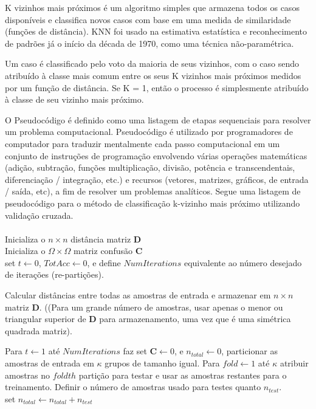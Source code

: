 \documentclass[letterpaper, 10 pt, conference]{ieeeconf}  %
\begin{document}
K vizinhos mais próximos é um algoritmo simples que armazena todos os casos disponíveis e classifica novos casos com base em uma medida de similaridade (funções de distância). KNN foi usado na estimativa estatística e reconhecimento de padrões já o início da década de 1970, como uma técnica não-paramétrica.

Um caso é classificado pelo voto da maioria de seus vizinhos, com o caso sendo atribuído à classe mais comum entre os seus K vizinhos mais próximos medidos por um função de distância. Se K = 1, então o processo é simplesmente atribuído à classe de seu vizinho mais próximo.

O Pseudocódigo é definido como uma listagem de etapas sequenciais para resolver um problema computacional. Pseudocódigo é utilizado por programadores de computador para traduzir mentalmente cada passo computacional em um conjunto de instruções de programação envolvendo várias operações matemáticas (adição, subtração, funções multiplicação, divisão, potência e transcendentais, diferenciação / integração, etc.) e recursos (vetores, matrizes, gráficos, de entrada / saída, etc), a fim de resolver um problemas analíticos. Segue uma listagem de pseudocódigo para o método de classificação k-vizinho mais próximo utilizando validação cruzada. \\
\\
Inicializa o $n \times n$ distância matriz $\textbf{D}$ \\
Inicializa o $\Omega \times \Omega$ matriz confusão $\textbf{C}$ \\

set $t \leftarrow 0$, $TotAcc \leftarrow 0$, e define $NumIterations$ equivalente ao número desejado de  iterações (re-partições). 
 
Calcular distâncias entre todas as amostras de entrada e armazenar em $n \times n$ matriz $\textbf{D} $. ((Para um grande número de amostras, usar apenas o menor ou triangular superior de $\textbf{D}$ para armazenamento, uma vez que é uma simétrica quadrada matriz).

Para $t \leftarrow 1$ até $NumIterations$ faz set $\textbf{C} \leftarrow 0$, e $n_{total} \leftarrow 0$, particionar as amostras de entrada em $\kappa$ grupos de tamanho igual.
Para $fold \leftarrow 1$ até $\kappa$ atribuir amostras no $foldth$ partição para testar e usar as amostras restantes para o treinamento. Definir o número de amostras usado para testes quanto  $n_{test}$.\\

set $n_{total} \leftarrow n_{total}+n_{test}$\\
\end{document}
